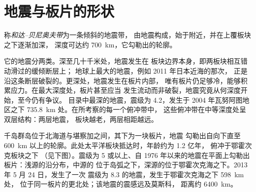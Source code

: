 \section{地震与板片的形状}\label{sec:b1:active-margins:seismicity}

\begin{definition}[和达–贝尼奥夫带]\label{def:b1:active-margins:wadati-benioff}
称\emph{和达–贝尼奥夫带}为一条倾斜的地震带，
由地震构成，始于附近，并在上覆板块之下逐渐加深，
深度可达约 \qty{700}{km}，它勾勒出的轮廓。
\end{definition}

它的地震分两类。深至几十千米处，地震发生在
板块边界本身，即两板块相互错动滑过的缓倾断层上；
地球上最大的地震，例如 2011 年日本近海的那次，
正是沿这条断层破裂的。更深处，地震发生在板片内部，
唯有板片仍足够冷，能够积累应力。在最大深度处，板片甚至应当
发生流动而非破裂，地震究竟从何深度开始，至今仍有争议。
目录中最深的地震，震级为 4.2，发生于
2004 年瓦努阿图地区之下 \qty{735.8}{km} 处。在所考察的每一个俯冲带中，
这些俯冲带在中等深度处呈双层结构：两层地震，
板块越老，两层相距越远。

千岛群岛位于北海道与堪察加之间，其下为一块板片，地震
勾勒出自向下直至 \qty{600}{km} 以上的轮廓。此处太平洋板块抵达时，年龄约为 1.2 亿年，
俯冲于鄂霍次克板块之下
（见下图）。震级为 5 或以上、自
1976 年以来的地震在平面上勾勒出板片：浅源的沿分布，中源的
位于岛弧之下，深源的位于鄂霍次克海之下。2013 年 5 月 24 日，发生了一次
震级为 8.3 的地震，发生于鄂霍次克海之下 \qty{598}{km} 处，
位于同一板片的更北处；该地震的震感远及莫斯科，
距离约 \qty{6400}{km}。

